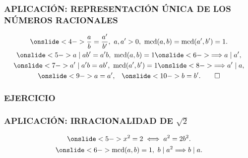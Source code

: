 \begin{frame}
  \frametitle{APLICACIÓN: REPRESENTACIÓN ÚNICA DE LOS NÚMEROS RACIONALES}



  \begin{gather*}
    \onslide<4->{\frac{a}{b} = \frac{a'}{b'}, ~ a, a' > 0, ~ \mcd (a,b) = \mcd (a',b') = 1.} \\
    \onslide<5->{a \mid ab' = a'b, ~ \mcd (a,b) = 1}
    \onslide<6->{\Longrightarrow a \mid a',} \\
    \onslide<7->{a' \mid a'b = ab', ~ \mcd (a',b') = 1}
    \onslide<8->{\Longrightarrow a' \mid a,} \\
    \onslide<9->{a = a',} \quad \onslide<10->{b = b'. \qed}
  \end{gather*}
\end{frame}

\begin{frame}
  \frametitle{EJERCICIO}

\end{frame}

\begin{frame}
  \frametitle{APLICACIÓN: IRRACIONALIDAD DE $\sqrt{2}$}




  \begin{gather*}
    \onslide<5->{x^2 = 2 \iff a^2 = 2b^2.} \\
    \onslide<6->{\mcd(a,b) = 1, ~ b \mid a^2 \Longrightarrow b \mid a.}
  \end{gather*}

\end{frame}

